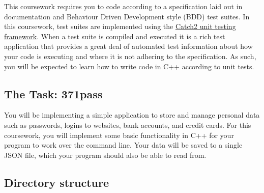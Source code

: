 \documentclass[a4paper]{article}
\begin{document}
This coursework requires you to code according to a specification laid out in documentation and Behaviour Driven Development style (BDD) test suites. In this coursework, test suites are implemented using the \href{https://github.com/catchorg/Catch2}{Catch2 unit testing framework}. When a test suite is compiled and executed it is a rich test application that provides a great deal of automated test information about how your code is executing and where it is not adhering to the specification. As such, you will be expected to learn how to write code in C++ according to unit tests.



\subsection*{The Task: 371pass}
You will be implementing a simple application to store and manage personal data such as passwords, logins to websites, bank accounts, and credit cards. For this coursework, you will implement some basic functionality in C++ for your program to work over the command line. Your data will be saved to a single JSON file, which your program should also be able to read from.


\subsection*{Directory structure}\label{sec:cwk dir}

\end{document}
